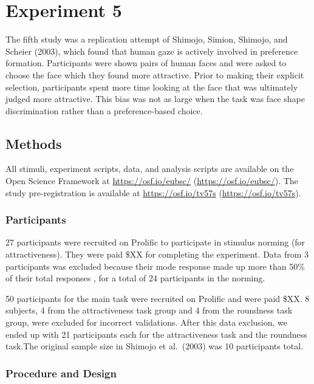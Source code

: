 \documentclass[
  english,
  man,floatsintext]{apa6}
\begin{document}
\hypertarget{experiment-5}{%
\section{Experiment 5}\label{experiment-5}}

The fifth study was a replication attempt of Shimojo, Simion, Shimojo, and Scheier (2003), which found that human gaze is actively involved in preference formation. Participants were shown pairs of human faces and were asked to choose the face which they found more attractive. Prior to making their explicit selection, participants spent more time looking at the face that was ultimately judged more attractive. This bias was not as large when the task was face shape discrimination rather than a preference-based choice.

\hypertarget{methods-4}{%
\subsection{Methods}\label{methods-4}}

All stimuli, experiment scripts, data, and analysis scripts are available on the Open Science Framework at \url{https://osf.io/eubsc/} (\url{https://osf.io/eubsc/}). The study pre-registration is available at \url{https://osf.io/tv57s} (\url{https://osf.io/tv57s}).

\hypertarget{participants-5}{%
\subsubsection{Participants}\label{participants-5}}

27 participants were recruited on Prolific to participate in stimulus norming (for attractiveness). They were paid \$XX for completing the experiment. Data from 3 participants was excluded because their mode response made up more than 50\% of their total responses , for a total of 24 participants in the norming.

50 participants for the main task were recruited on Prolific and were paid \$XX. 8 subjects, 4 from the attractiveness task group and 4 from the roundness task group, were excluded for incorrect validations. After this data exclusion, we ended up with 21 participants each for the attractiveness task and the roundness task.The original sample size in Shimojo et al.~(2003) was 10 participants total.

\hypertarget{procedure-and-design}{%
\subsubsection{Procedure and Design}\label{procedure-and-design}}
\end{document}
